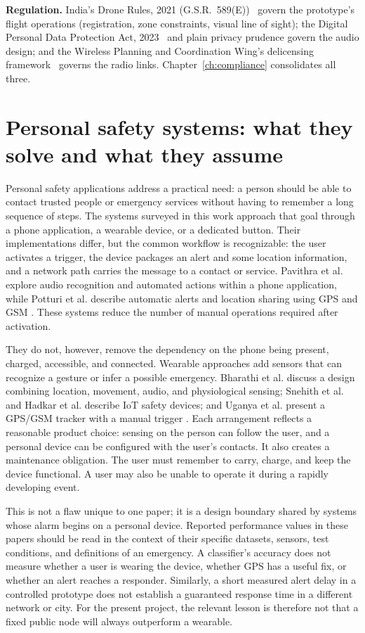 \documentclass[12pt,a4paper]{report}
\begin{document}
\textbf{Regulation.} India's Drone Rules, 2021
(G.S.R.~589(E))~\cite{dronerules} govern the prototype's flight
operations (registration, zone constraints, visual line of sight); the
Digital Personal Data Protection Act, 2023~\cite{dpdp} and plain
privacy prudence govern the audio design; and the Wireless Planning
and Coordination Wing's delicensing framework~\cite{wpc} governs the
radio links. Chapter~\ref{ch:compliance} consolidates all three.

\section{Personal safety systems: what they solve and what they assume}

Personal safety applications address a practical need: a person should be able to contact trusted people or emergency services without having to remember a long sequence of steps. The systems surveyed in this work approach that goal through a phone application, a wearable device, or a dedicated button. Their implementations differ, but the common workflow is recognizable: the user activates a trigger, the device packages an alert and some location information, and a network path carries the message to a contact or service. Pavithra et al. explore audio recognition and automated actions within a phone application, while Potturi et al. describe automatic alerts and location sharing using GPS and GSM \cite{pavithra,potturi}. These systems reduce the number of manual operations required after activation.

They do not, however, remove the dependency on the phone being present, charged, accessible, and connected. Wearable approaches add sensors that can recognize a gesture or infer a possible emergency. Bharathi et al. discuss a design combining location, movement, audio, and physiological sensing; Snehith et al. and Hadkar et al. describe IoT safety devices; and Uganya et al. present a GPS/GSM tracker with a manual trigger \cite{bharathi,snehith,hadkar,uganya}. Each arrangement reflects a reasonable product choice: sensing on the person can follow the user, and a personal device can be configured with the user's contacts. It also creates a maintenance obligation. The user must remember to carry, charge, and keep the device functional. A user may also be unable to operate it during a rapidly developing event.

This is not a flaw unique to one paper; it is a design boundary shared by systems whose alarm begins on a personal device. Reported performance values in these papers should be read in the context of their specific datasets, sensors, test conditions, and definitions of an emergency. A classifier's accuracy does not measure whether a user is wearing the device, whether GPS has a useful fix, or whether an alert reaches a responder. Similarly, a short measured alert delay in a controlled prototype does not establish a guaranteed response time in a different network or city. For the present project, the relevant lesson is therefore not that a fixed public node will always outperform a wearable.
\end{document}
